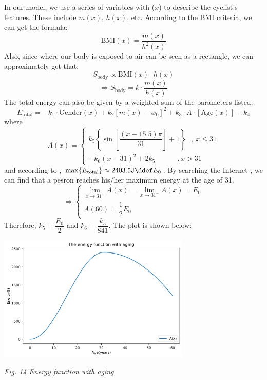 \documentclass{article}
\begin{document}
			In our model, we use a series of variables with (\(x\)) to describe the cyclist's features. These include $m( x )$, $ h ( x )$, etc. According to the BMI criteria, we can get the formula:
			$$\mathrm{BMI}( x )=\dfrac{m( x )}{ h ^2( x )}$$
			Also, since where our body is exposed to air can be seen as a rectangle, we can approximately get that:
			\[S_{\mathrm{body}} \propto \mathrm{BMI}(x)\cdot h(x)\]
			\[\Rightarrow S_{\mathrm{body}}=k\cdot \dfrac{m(x)}{h(x)}\]
			The total energy can also be given by a weighted sum of the parameters listed:
			\[E_{\mathrm{total}}=-k_1\cdot\mathrm{Gender}(x)+k_2[m(x)-w_0]^2+k_3\cdot A\cdot [\mathrm{Age}(x)]+k_4\]
			where
			\[A(x)=
				\begin{cases}
					k_5\left\{\sin\left[\dfrac{(x-15.5)\pi}{31 }\right]+1\right\}~~~,~x\leq 31 \\
					-k_6 (x-31)^2+2k_5~~~~~~~~~~~~~~,x>31
				\end{cases}
			\]
			and according to \cite{114514}, \(\max\{E_{\mathrm{total}}\}\approx 2403.5 \mathrm{J}\ddef E_{0}\). By searching the Internet \cite{energy curve}, we can find that a pesron reaches his/her maximum energy at the age of 31.
			\[
				\Rightarrow
				\begin{cases}
					\lim\limits_{x\rightarrow 31^+} A\left( x \right) =\lim\limits_{x\rightarrow 31^-} A\left( x \right)=E_0 \\
					A(60)=\dfrac 12 E_0
				\end{cases}
			\]
			Therefore, \(k_5 = \dfrac{E_0}{2}\) and \(k_6=\dfrac{k_5}{841}\). The plot is shown below:
			\begin{center}
				\includegraphics[height = 6cm]{energy function with aging.png}

				\small\textit{Fig. 14 Energy function with aging}
			\end{center}

\end{document}
